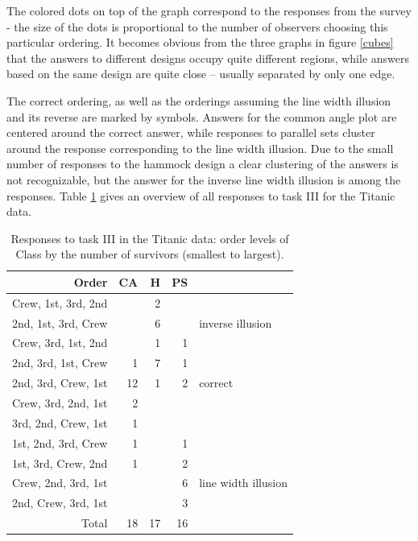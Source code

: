 The colored dots on top of the graph correspond to the responses from the survey - the size of the dots is proportional to the number of observers choosing this particular ordering. It becomes obvious from the three graphs in figure \ref{cubes} that
the answers to different designs occupy quite different regions, while answers based  on the same design are quite close --  usually separated by only one edge. 

The correct ordering, as well as the orderings assuming the line width illusion and its reverse are marked by symbols. Answers for the common angle plot are centered around the correct answer, while responses to parallel sets  cluster around the response corresponding to the line width illusion. Due to the small number of responses to the hammock design a clear clustering of the answers is not recognizable, but the answer for the inverse line width illusion is among the responses. Table \ref{a2} gives an overview of all responses to task III for the Titanic data.

\begin{table}[ht]
\begin{center}
\begin{tabular}{rrrrl}
Order  & CA & H & PS\\
  \hline
  Crew, 1st, 3rd, 2nd &  &  2 &  \\ 
  2nd, 1st, 3rd, Crew &  &  6 &  & inverse illusion \\ 
   Crew, 3rd, 1st, 2nd &  &  1 &  1 \\ 
  2nd, 3rd, 1st, Crew & 1 & 7 & 1 \\ 
  2nd, 3rd, Crew, 1st & 12 &  1 &  2 & correct\\ 
  Crew, 3rd, 2nd, 1st &  2 &  &  \\ 
  3rd, 2nd, Crew, 1st &  1 &  &  \\ 
  1st, 2nd, 3rd, Crew &  1 &  &  1 \\ 
  1st, 3rd, Crew, 2nd &  1 &  &  2 \\ 
  Crew, 2nd, 3rd, 1st &  &  & 6 &  line width illusion\\  
  2nd, Crew, 3rd, 1st &  &  &  3 \\ 
   \hline
  Total & 18 & 17 & 16 \\ 
   \hline
\end{tabular}
\end{center}
\caption{\label{a2} Responses to task III in the Titanic data: order levels of Class by the number of survivors (smallest to largest). }
\end{table}

